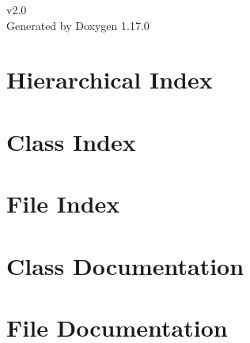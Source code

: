 \documentclass[twoside]{book}
\newcommand{\+}{\discretionary{\mbox{\scriptsize$\hookleftarrow$}}{}{}}
\newcommand{\clearemptydoublepage}{%
    \newpage{\pagestyle{empty}\cleardoublepage}%
  }
\begin{document}
  \raggedbottom
    \hypersetup{pageanchor=false,
                bookmarksnumbered=true,
                pdfencoding=unicode
               }
  \begin{titlepage}
  \vspace*{7cm}
  \begin{center}%
  {\Large v2.\+0}\\
  \vspace*{1cm}
  {\large Generated by Doxygen 1.17.0}\\
  \end{center}
  \end{titlepage}
  \clearemptydoublepage
  \tableofcontents
  \clearemptydoublepage
  \hypersetup{pageanchor=true}
\chapter{Hierarchical Index}

\chapter{Class Index}

\chapter{File Index}

\chapter{Class Documentation}


\chapter{File Documentation}




























  \backmatter
  \newpage
  \clearemptydoublepage
  \printindex
\end{document}
